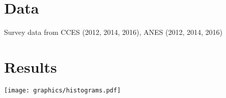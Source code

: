 \documentclass[a0]{a0poster}
\begin{document}
\begin{multicols*}{3}
\section*{Data}

Survey data from CCES (2012, 2014, 2016), ANES (2012, 2014, 2016)

\columnbreak




\section*{Results}

\begin{center}
  \texttt{[image: graphics/histograms.pdf]}
\end{center}



%
\vfill
\footnotesize
\printbibliography
% 
% 

\end{multicols*}
\end{document}

